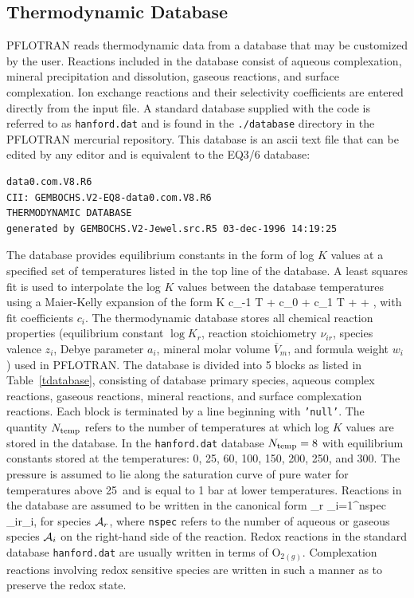 \subsection{Thermodynamic Database}
\label{thermo:database}

PFLOTRAN reads thermodynamic data from a database that may be customized by the user. Reactions included in the database consist of aqueous complexation, mineral precipitation and dissolution, gaseous reactions, and surface complexation. Ion exchange reactions and their selectivity coefficients are entered directly from the input file. 
A standard database supplied with the code is referred to as {\tt hanford.dat} and is found in the {\tt ./database} directory in the PFLOTRAN mercurial repository. This database is an ascii text file that can be edited by any editor and is equivalent to the EQ3/6 database:
\footnotesize
\begin{verbatim}
data0.com.V8.R6
CII: GEMBOCHS.V2-EQ8-data0.com.V8.R6
THERMODYNAMIC DATABASE
generated by GEMBOCHS.V2-Jewel.src.R5 03-dec-1996 14:19:25
\end{verbatim}
\normalsize
The database provides equilibrium constants in the form of log $K$ values at a specified set of temperatures listed in the top line of the database. A least squares fit is used to interpolate the log $K$ values between the database temperatures using a Maier-Kelly expansion of the form
\EQ\label{mk}
\log K \eq c_{-1} \ln T + c_0 + c_1 T +  + ,
\EN
with fit coefficients $c_i$. 
The thermodynamic database stores all chemical reaction properties (equilibrium constant $\log K_r$, reaction stoichiometry $\nu_{ir}$, species valence $z_i$, Debye parameter $a_i$, mineral molar volume $\overline V_m$, and formula weight $w_i$) used in PFLOTRAN. The database is divided into 5 blocks as listed in Table~\ref{tdatabase}, consisting of
database primary species, aqueous complex reactions, gaseous reactions, mineral reactions, and surface complexation reactions. 
Each block is terminated by a line beginning with {\tt 'null'}. 
The quantity $N_{\rm temp}$ refers to the number of temperatures at which log $K$ values are stored in the database.
In the {\tt hanford.dat} database $N_{\rm temp}=8$ with equilibrium constants stored at the temperatures: 0, 25, 60, 100, 150, 200, 250, and 300\degc. The pressure is assumed to lie along the saturation curve of pure water for temperatures above 25\degc\ and is equal to 1 bar at lower temperatures.
Reactions in the database are assumed to be written in the canonical form
\EQ
\A_r \arrows \sum_{i=1}^{\rm nspec} \nu_{ir}\A_i,
\EN
for species ${\mathcal A}_r$, where {\tt nspec} refers to the number of aqueous or gaseous species ${\mathcal A}_i$ on the right-hand side of the reaction. 
Redox reactions in the standard database {\tt hanford.dat} are usually written in terms of O$_{2(g)}$.
Complexation reactions involving redox sensitive species are written in such a manner as to preserve the redox state.


